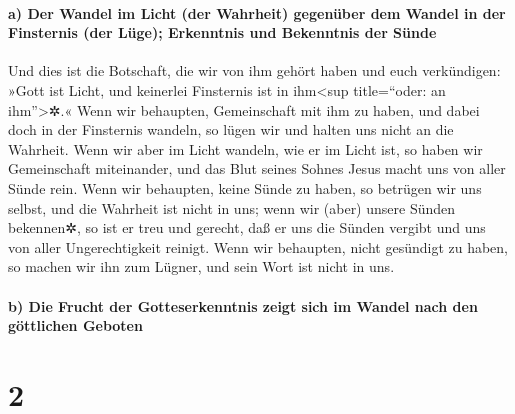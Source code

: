 \hypertarget{a-der-wandel-im-licht-der-wahrheit-gegenuxfcber-dem-wandel-in-der-finsternis-der-luxfcge-erkenntnis-und-bekenntnis-der-suxfcnde}{%
\paragraph{a) Der Wandel im Licht (der Wahrheit) gegenüber dem Wandel in
der Finsternis (der Lüge); Erkenntnis und Bekenntnis der
Sünde}\label{a-der-wandel-im-licht-der-wahrheit-gegenuxfcber-dem-wandel-in-der-finsternis-der-luxfcge-erkenntnis-und-bekenntnis-der-suxfcnde}}

 Und dies ist die Botschaft, die wir von ihm gehört haben
und euch verkündigen: »Gott ist Licht, und keinerlei Finsternis ist in
ihm\textless sup title=``oder: an ihm''\textgreater✲.« 
Wenn wir behaupten, Gemeinschaft mit ihm zu haben, und dabei doch in der
Finsternis wandeln, so lügen wir und halten uns nicht an die Wahrheit.
 Wenn wir aber im Licht wandeln, wie er im Licht ist, so
haben wir Gemeinschaft miteinander, und das Blut seines Sohnes Jesus
macht uns von aller Sünde rein.  Wenn wir behaupten, keine
Sünde zu haben, so betrügen wir uns selbst, und die Wahrheit ist nicht
in uns;  wenn wir (aber) unsere Sünden bekennen✲, so ist
er treu und gerecht, daß er uns die Sünden vergibt und uns von aller
Ungerechtigkeit reinigt.  Wenn wir behaupten, nicht
gesündigt zu haben, so machen wir ihn zum Lügner, und sein Wort ist
nicht in uns.

\hypertarget{b-die-frucht-der-gotteserkenntnis-zeigt-sich-im-wandel-nach-den-guxf6ttlichen-geboten}{%
\paragraph{b) Die Frucht der Gotteserkenntnis zeigt sich im Wandel nach
den göttlichen
Geboten}\label{b-die-frucht-der-gotteserkenntnis-zeigt-sich-im-wandel-nach-den-guxf6ttlichen-geboten}}

\hypertarget{section-1}{%
\section{2}\label{section-1}}

